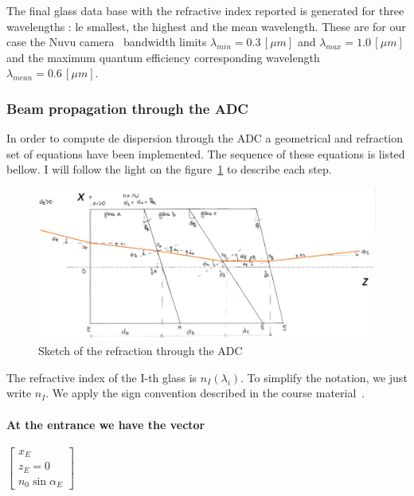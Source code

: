 The final glass data base with the refractive index reported is generated for three wavelengths : le smallest, the highest and the mean wavelength. These are for our case the Nuvu camera~\cite{NuvuQE} bandwidth limits $\lambda_{min} = 0.3\,[\mu m]$ and $\lambda_{max} = 1.0\,[\mu m]$ and the maximum quantum efficiency corresponding wavelength $\lambda_{mean} = 0.6\,[\mu m]$.














\subsubsection{Beam propagation through the ADC}
In order to compute de dispersion through the ADC a geometrical and refraction set of equations have been implemented. The sequence of these equations is listed bellow. I will follow the light on the figure~\ref{fig:ADCgeometrie} to describe each step.
\begin{figure}[H]
\centering
	\includegraphics[width = \textwidth]{images/ADCgeometrie.png}
	\caption{Sketch of the refraction through the ADC}\label{fig:ADCgeometrie}
	\centering
\end{figure}
The refractive index of the I-th glass is $n_I(\lambda_i)$. To simplify the notation, we just write $n_I$.
We apply the sign convention described in the course material~\cite{coursOptLJT}.
\paragraph*{At the entrance we have the vector}
$\begin{bmatrix}x_E \\ z_E = 0 \\ n_0\sin\alpha_E\end{bmatrix}$
 
